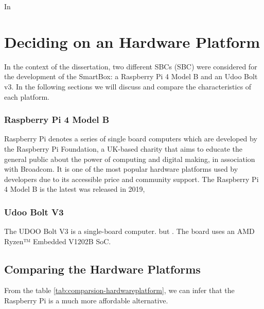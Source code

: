 
In

\section{Deciding on an Hardware Platform}

In the context of the dissertation, two different \acl{SBC}s (\acs{SBC}) were considered for the development of the SmartBox: a Raspberry Pi 4 Model B and an Udoo Bolt v3. In the following sections we will discuss and compare the characteristics of each platform. 


\subsubsection{Raspberry Pi 4 Model B}

Raspberry Pi denotes a series of single board computers which are developed by the Raspberry Pi Foundation, a UK-based charity that aims to educate the general public about the power of computing and digital making, in association with Broadcom. It is one of the most popular hardware platforms used by developers due to its accessible price and community support.
The Raspberry Pi 4 Model B is the latest  was released in 2019, 

\subsubsection{Udoo Bolt V3}

The UDOO Bolt V3 is a single-board computer.  but . The board uses an AMD Ryzen™ Embedded V1202B SoC.

\subsection{Comparing the Hardware Platforms}

From the table \ref{tab:comparsion-hardwareplatform}, we can infer that the Raspberry Pi is a much more affordable alternative.


